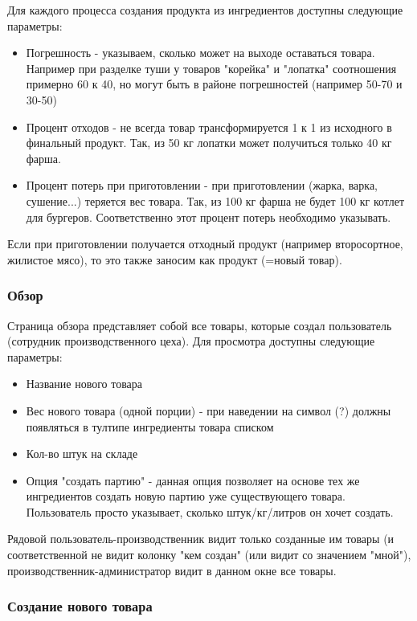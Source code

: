 \documentclass[DIV=calc, paper=a4, fontsize=11pt]{scrartcl} %
\begin{document}
Для каждого процесса создания продукта из ингредиентов доступны следующие параметры:

\begin{itemize}
	\item Погрешность - указываем, сколько может на выходе оставаться товара. Например при разделке туши у товаров "корейка" и "лопатка" соотношения примерно 60 к 40, но могут быть в районе погрешностей (например 50-70 и 30-50)
	\item Процент отходов - не всегда товар трансформируется 1 к 1 из исходного в финальный продукт. Так, из 50 кг лопатки может получиться только 40 кг фарша.
	\item Процент потерь при приготовлении - при приготовлении (жарка, варка, сушение...) теряется вес товара. Так, из 100 кг фарша не будет 100 кг котлет для бургеров. Соответственно этот процент потерь необходимо указывать. 
\end{itemize}

Если при приготовлении получается отходный продукт (например второсортное, жилистое мясо), то это также заносим как продукт (=новый товар).

\subsubsection{Обзор}
Страница обзора представляет собой все товары, которые создал пользователь (сотрудник производственного цеха). Для просмотра доступны следующие параметры:

\begin{itemize}
	\item Название нового товара
	\item Вес нового товара (одной порции) - при наведении на символ (?) должны появляться в тултипе ингредиенты товара списком
	\item Кол-во штук на складе 
	\item Опция "создать партию" - данная опция позволяет на основе тех же ингредиентов создать новую партию уже существующего товара. Пользователь просто указывает, сколько штук/кг/литров он хочет создать.
\end{itemize}

Рядовой пользователь-производственник видит только созданные им товары (и соответственной не видит колонку "кем создан" (или видит со значением "мной"), производственник-администратор видит в данном окне все товары.

\subsubsection{Создание нового товара}
\end{document}
